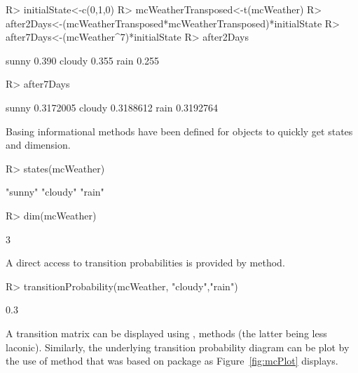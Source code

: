 \documentclass[nojss]{jss}
\begin{document}
\begin{Schunk}
\begin{Sinput}
R> initialState<-c(0,1,0)
R> mcWeatherTransposed<-t(mcWeather)
R> after2Days<-(mcWeatherTransposed*mcWeatherTransposed)*initialState
R> after7Days<-(mcWeather^7)*initialState
R> after2Days
\end{Sinput}
\begin{Soutput}
        [,1]
sunny  0.390
cloudy 0.355
rain   0.255
\end{Soutput}
\begin{Sinput}
R> after7Days
\end{Sinput}
\begin{Soutput}
            [,1]
sunny  0.3172005
cloudy 0.3188612
rain   0.3192764
\end{Soutput}
\end{Schunk}

Basing informational methods have been defined for  objects to quickly get states and dimension.

\begin{Schunk}
\begin{Sinput}
R> states(mcWeather)
\end{Sinput}
\begin{Soutput}
[1] "sunny"  "cloudy" "rain"  
\end{Soutput}
\begin{Sinput}
R> dim(mcWeather)
\end{Sinput}
\begin{Soutput}
[1] 3
\end{Soutput}
\end{Schunk}

A direct access to transition probabilities is provided by  method.

\begin{Schunk}
\begin{Sinput}
R> transitionProbability(mcWeather, "cloudy","rain")
\end{Sinput}
\begin{Soutput}
[1] 0.3
\end{Soutput}
\end{Schunk}

A transition matrix can be displayed using ,  methods (the latter being less laconic). Similarly, the underlying transition probability diagram can be plot by the use of  method that was based on  package \citep{pkg:igraph} as Figure~\ref{fig:mcPlot} displays.
\end{document}
